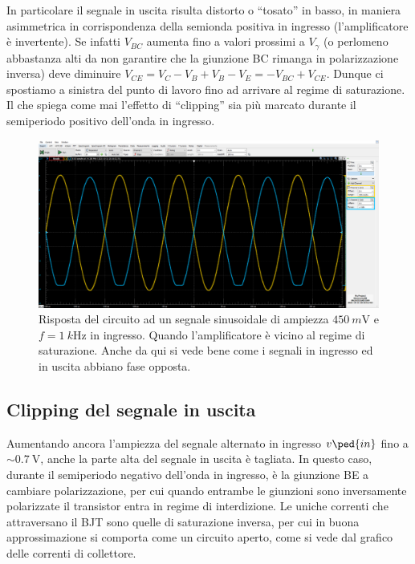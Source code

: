 \documentclass[10pt,a4paper]{article}
\begin{document}
In particolare il segnale in uscita risulta distorto o ``tosato'' in basso,
in maniera asimmetrica in corrispondenza della semionda positiva in ingresso
(l'amplificatore è invertente). Se infatti $V_{BC}$ aumenta fino a valori
prossimi a $V_\gamma$ (o perlomeno abbastanza alti da non garantire che la
giunzione BC rimanga in polarizzazione inversa) deve diminuire
$V_{CE} = V_C - V_B + V_B - V_E = -V_{BC} + V_{CE}$. Dunque ci spostiamo a
sinistra del punto di lavoro fino ad arrivare al regime di saturazione.
Il che spiega come mai l'effetto di ``clipping'' sia più marcato durante
il semiperiodo positivo dell'onda in ingresso.

\begin{figure}[htb]
\centering
\includegraphics[scale=0.335]{Asat400mV}
\caption{Risposta del circuito ad un segnale sinusoidale di ampiezza
$\SI{450}{m\V}$ e $f = \SI{1}{k\Hz}$ in ingresso. Quando l'amplificatore
è vicino al regime di saturazione. Anche da qui si vede bene come i segnali
in ingresso ed in uscita abbiano fase opposta. \label{fig: Asat}}
\end{figure}


\subsection{Clipping del segnale in uscita}
Aumentando ancora l'ampiezza del segnale alternato in ingresso $v\ped{in}$ fino
a $\sim \SI{0.7}{\V}$, anche la parte alta del segnale in uscita è tagliata.
In questo caso, durante il semiperiodo negativo dell'onda in ingresso, è la
giunzione BE a cambiare polarizzazione, per cui quando entrambe le giunzioni
sono inversamente polarizzate il transistor entra in regime di interdizione.
Le uniche correnti che attraversano il BJT sono quelle di saturazione inversa,
per cui in buona approssimazione si comporta come un circuito aperto, come si
vede dal grafico delle correnti di collettore.
\end{document}
